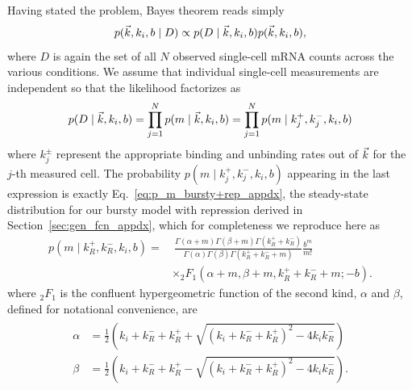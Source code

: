 Having stated the problem, Bayes theorem reads simply
\begin{equation}
p(\vec{k}, k_i, b \mid D)
\propto
p(D \mid\vec{k}, k_i, b) p(\vec{k}, k_i, b),
\end{equation}
where $D$ is again the set of all $N$ observed single-cell mRNA counts
across the various conditions. We assume that individual single-cell
measurements are independent so that the likelihood factorizes as
\begin{equation}
p(D \mid\vec{k}, k_i, b)
= \prod_{j=1}^N p(m\mid \vec{k}, k_i, b)
= \prod_{j=1}^N p(m\mid k_j^+, k_j^-, k_i, b)
\end{equation}
where $k_j^\pm$ represent the appropriate binding and unbinding
rates out of $\vec{k}$ for the $j$-th measured cell. The probability
$p(m\mid k_j^+, k_j^-, k_i, b)$ appearing in the last expression
is exactly Eq.~\ref{eq:p_m_bursty+rep_appdx}, the steady-state
distribution for our bursty model with repression derived in
Section~\ref{sec:gen_fcn_appdx}, which for completeness we reproduce here as
\begin{equation}
\begin{split}
p(m \mid k_R^+, k_R^-, k_i, b) = & ~\frac{
        \Gamma(\alpha + m)\Gamma(\beta + m)\Gamma(k_R^+ + k_R^-)
        }
        {
        \Gamma(\alpha)\Gamma(\beta)\Gamma(k_R^+ + k_R^- + m)
        }
\frac{b^m}{m!}
\\
&\times {_2F_1}(\alpha+m, \beta+m, k_R^++k_R^-+m; -b).
\end{split}
\label{eq:p_m_bursty+rep}
\end{equation}
where $_2F_1$ is the confluent hypergeometric function of the second kind,
$\alpha$ and $\beta$, defined for notational convenience, are
\begin{align}
\begin{split}
\alpha &= \frac{1}{2}
\left(k_i+k_R^-+k_R^+ + \sqrt{(k_i+k_R^-+k_R^+)^2 - 4k_i k_R^-}\right)
\\
\beta &= \frac{1}{2}
\left(k_i+k_R^-+k_R^+ - \sqrt{(k_i+k_R^-+k_R^+)^2 - 4k_i k_R^-}\right).
\end{split}
\end{align}

